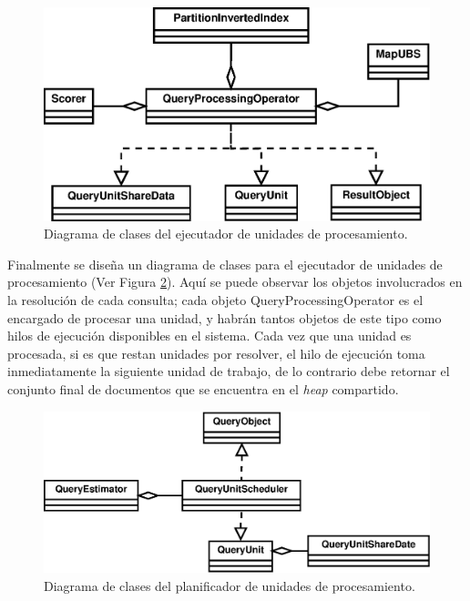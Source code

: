 \begin{figure}[!th]
\centering
\includegraphics[scale=.75]{images/QueryUnitExecuter.eps}
\caption{Diagrama de clases del ejecutador de unidades de procesamiento.}
\label{fig:queryunit_scheduler}
\end{figure}

Finalmente se diseña un diagrama de clases para el ejecutador de unidades de procesamiento (Ver Figura \ref{fig:queryunit_scheduler}). Aquí se puede observar los objetos involucrados en la resolución de cada consulta; cada objeto QueryProcessingOperator es el encargado de procesar una unidad, y habrán tantos objetos de este tipo como hilos de ejecución disponibles en el sistema. Cada vez que una unidad es procesada, si es que restan unidades por resolver, el hilo de ejecución toma inmediatamente la siguiente unidad de trabajo, de lo contrario debe retornar el conjunto final de documentos que se encuentra en el \textit{heap} compartido. 

\begin{figure}[!th]
\centering
\includegraphics[scale=.75]{images/QueryUnitScheduler.eps}
\caption{Diagrama de clases del planificador de unidades de procesamiento.}
\label{fig:queryunit_scheduler}
\end{figure}